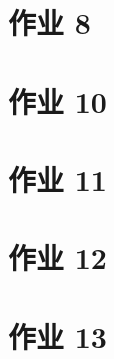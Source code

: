 \documentclass[main.tex]{subfiles}
\begin{document}
\section{作业 8}

\section{作业 10}

\section{作业 11}

\section{作业 12}

\section{作业 13}

\end{document}
